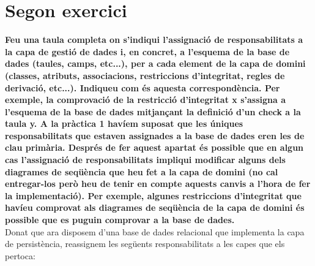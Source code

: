 \section{Segon exercici}

\textbf{Feu una taula completa on s’indiqui l’assignació de responsabilitats a la capa de gestió de dades i, en concret, a l’esquema de la base de dades (taules, camps, etc...), per a cada element de la capa de domini (classes, atributs, associacions, restriccions d’integritat, regles de derivació, etc...). Indiqueu com és aquesta correspondència. Per exemple, la comprovació de la restricció d’integritat x s’assigna a l’esquema de la base de dades mitjançant la definició d’un check a la taula y. A la pràctica 1 havíem suposat que les úniques responsabilitats que estaven assignades a la base de dades eren les de clau primària. Després de fer aquest apartat és possible que en algun cas l’assignació de responsabilitats impliqui modificar alguns dels diagrames de seqüència que heu fet a la capa de domini (no cal entregar-los però heu de tenir en compte aquests canvis a l’hora de fer la implementació). Per exemple, algunes restriccions d’integritat que havíeu comprovat als diagrames de seqüència de la capa de domini és possible que es puguin comprovar a la base de dades.}\\

Donat que ara disposem d’una base de dades relacional que implementa la capa de persistència, reassignem les següents responsabilitats a les capes que els pertoca:

